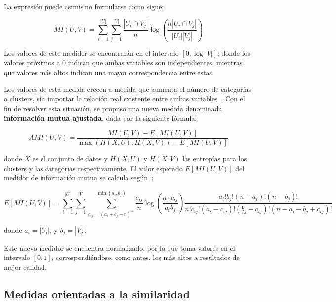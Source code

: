 La expresión puede asimismo formularse como sigue:

\begin{equation}
    \label{eq:mutual-information-cardinality}
    MI(U,V) = \sum_{i=1}^{|U|}\sum_{j=1}^{|V|}{\frac{|U_i \cap V_j|}{n}\log{\left( \frac{n|U_i \cap V_j|}{|U_i||V_j|} \right)}}
\end{equation}

Los valores de este medidor se encontrarán en el intervalo $[0,\log{|V|}]$;
donde los valores próximos a 0 indican que ambas variables son independientes, mientras que valores más altos indican una mayor correspondencia entre estas.

Los valores de esta medida crecen a medida que aumenta el número de categorías o clusters, sin importar la relación real existente entre ambas variables~\cite{Vinh10}.
Con el fin de resolver esta situación, se propuso una nueva medida denominada \textbf{información mutua ajustada}, dada por la siguiente fórmula:

\begin{equation}
    \label{eq:adjusted-mutual-information}
    AMI(U,V) = \frac{MI(U,V) - E[MI(U,V)]}{\max{(H(X, U), H(X, V)) - E[MI(U,V)]}}
\end{equation}

\noindent
donde $X$ es el conjunto de datos y $H(X,U)$ y $H(X,V)$ las entropías para los clusters y las categorías respectivamente.
El valor esperado $E[MI(U,V)]$ del medidor de información mutua se calcula según~\cite{Vinh10}:

{\footnotesize
\begin{equation*}
    \label{eq:expected-value-mutual-information}
    E[MI(U,V)] = \sum_{i=1}^{|U|}\sum_{j=1}^{|V|}\sum_{c_{ij}=(a_i+b_j-n)^{+}}^{\min{(a_i,b_j)}}
    {
    \frac{c_{ij}}{n}
    \log{\left( \frac{n \cdot c_{ij}}{a_i b_j} \right)}
    \frac{a_i ! b_j ! (n-a_i)!(n-b_j)!}{n!c_{ij}!(a_i-c_{ij})!(b_j-c_{ij})!(n-a_i-b_j+c_{ij})!}
    }
\end{equation*}
}

\noindent
donde $a_i = |U_i|$, y $b_j = |V_j|$.

Este nuevo medidor se encuentra normalizado, por lo que toma valores en el intervalo $[0, 1]$, correspondiéndose, como antes, los más altos a resultados de mejor calidad.

\subsection{Medidas orientadas a la similaridad}\label{subsec:medidasOrientadasALaSimilaridad}

